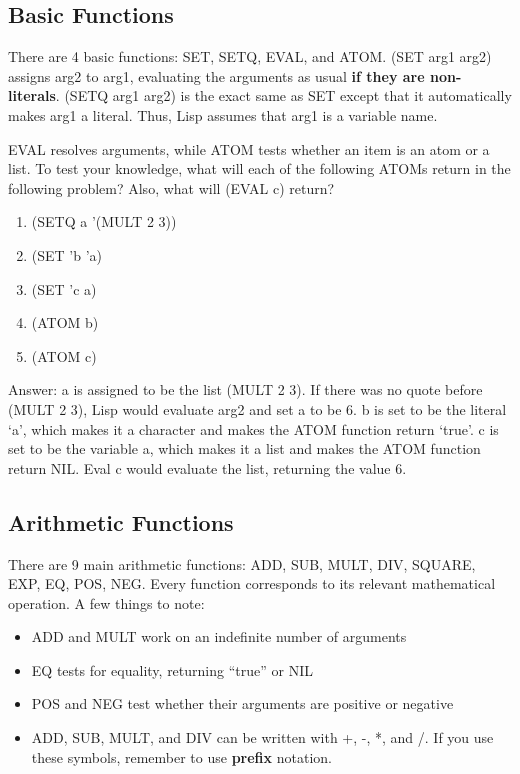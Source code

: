 \documentclass[11pt,letterpaper]{article}
\begin{document}
    \subsection{Basic Functions}
    There are 4 basic functions: SET, SETQ, EVAL, and ATOM.
    (SET arg1 arg2) assigns arg2 to arg1, evaluating the arguments as usual
    \textbf{if they are non-literals}.
    (SETQ arg1 arg2) is the exact same as SET except that it automatically makes arg1
    a literal.
    Thus, Lisp assumes that arg1 is a variable name.

    EVAL resolves arguments, while ATOM tests whether an item is an atom or a list.
    To test your knowledge, what will each of the following ATOMs return in
    the following problem?
    Also, what will (EVAL c) return?
    \begin{enumerate}
        \item (SETQ a '(MULT 2 3))
        \item (SET 'b 'a)
        \item (SET 'c a)
        \item (ATOM b)
        \item (ATOM c)
    \end{enumerate}
    Answer: a is assigned to be the list (MULT 2 3).
    If there was no quote before (MULT 2 3), Lisp would evaluate arg2 and set
    a to be 6.
    b is set to be the literal `a', which makes it a character and makes
    the ATOM function return `true'.
    c is set to be the variable a, which makes it a list and makes the ATOM function
    return NIL.
    Eval c would evaluate the list, returning the value 6.

    \subsection{Arithmetic Functions}
    There are 9 main arithmetic functions: ADD, SUB, MULT, DIV, SQUARE,
    EXP, EQ, POS, NEG.
    Every function corresponds to its relevant mathematical operation.
    A few things to note:
    \begin{itemize}
        \item ADD and MULT work on an indefinite number of arguments
        \item EQ tests for equality, returning ``true'' or NIL
        \item POS and NEG test whether their arguments are positive or negative
        \item ADD, SUB, MULT, and DIV can be written with +, -, *, and /.
        If you use these symbols, remember to use \textbf{prefix} notation.
    \end{itemize}
\end{document}
